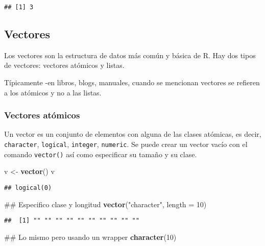 \documentclass[]{article}
\newenvironment{Shaded}{\begin{snugshade}}{\end{snugshade}}
\newcommand{\KeywordTok}[1]{\textcolor[rgb]{0.13,0.29,0.53}{\textbf{{#1}}}}
\newcommand{\DataTypeTok}[1]{\textcolor[rgb]{0.13,0.29,0.53}{{#1}}}
\newcommand{\DecValTok}[1]{\textcolor[rgb]{0.00,0.00,0.81}{{#1}}}
\newcommand{\StringTok}[1]{\textcolor[rgb]{0.31,0.60,0.02}{{#1}}}
\newcommand{\NormalTok}[1]{{#1}}
\begin{document}
\begin{verbatim}
## [1] 3
\end{verbatim}

\subsection{Vectores}\label{vectores}

Los vectores son la estructura de datos más común y básica de R. Hay dos
tipos de vectores: vectores atómicos y listas.

Típicamente -en libros, blogs, manuales, cuando se mencionan vectores se
refieren a los atómicos y no a las listas.

\subsubsection{Vectores atómicos}\label{vectores-atomicos}

Un vector es un conjunto de elementos con alguna de las clases atómicas,
es decir, \texttt{character}, \texttt{logical}, \texttt{integer},
\texttt{numeric}. Se puede crear un vector vacío con el comando
\texttt{vector()} así como especificar su tamaño y su clase.

\begin{Shaded}
\begin{Highlighting}[]
\NormalTok{v <-}\StringTok{ }\KeywordTok{vector}\NormalTok{()}
\NormalTok{v }
\end{Highlighting}
\end{Shaded}

\begin{verbatim}
## logical(0)
\end{verbatim}

\begin{Shaded}
\begin{Highlighting}[]
\NormalTok{## Especifico clase y longitud}
\KeywordTok{vector}\NormalTok{(}\StringTok{"character"}\NormalTok{, }\DataTypeTok{length =} \DecValTok{10}\NormalTok{)}
\end{Highlighting}
\end{Shaded}

\begin{verbatim}
##  [1] "" "" "" "" "" "" "" "" "" ""
\end{verbatim}

\begin{Shaded}
\begin{Highlighting}[]
\NormalTok{## Lo mismo pero usando un wrapper}
\KeywordTok{character}\NormalTok{(}\DecValTok{10}\NormalTok{)}
\end{Highlighting}
\end{Shaded}
\end{document}
